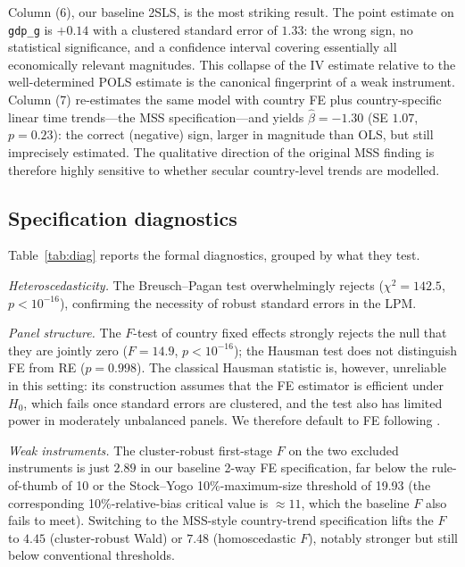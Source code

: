 \documentclass[11pt,a4paper]{article}
\begin{document}
Column (6), our baseline 2SLS, is the most striking result. The
point estimate on \texttt{gdp\_g} is $+0.14$ with a clustered
standard error of $1.33$: the wrong sign, no statistical
significance, and a confidence interval covering essentially all
economically relevant magnitudes. This collapse of the IV estimate
relative to the well-determined POLS estimate is the canonical
fingerprint of a weak instrument. Column (7) re-estimates the same
model with country FE plus country-specific linear time trends---the
MSS specification---and yields $\hat\beta=-1.30$ (SE $1.07$,
$p=0.23$): the correct (negative) sign, larger in magnitude than
OLS, but still imprecisely estimated. The qualitative direction of
the original MSS finding is therefore highly sensitive to whether
secular country-level trends are modelled.

\begin{table}[H]
\centering
\small

\caption{Effect of GDP growth on civil conflict in Africa, 1981--1999. Models~(1)--(6) include year fixed effects (where applicable); model~(7) replaces year FE with country-specific linear time trends. Cluster-robust SE in parentheses.}
\label{tab:main}
\end{table}

\subsection{Specification diagnostics}
Table~\ref{tab:diag} reports the formal diagnostics, grouped by what
they test.

\emph{Heteroscedasticity.}
The Breusch--Pagan test overwhelmingly rejects ($\chi^2=142.5$,
$p<10^{-16}$), confirming the necessity of robust standard errors in
the LPM.

\emph{Panel structure.}
The $F$-test of country fixed effects strongly rejects the null
that they are jointly zero ($F=14.9$, $p<10^{-16}$); the Hausman
test does not distinguish FE from RE ($p=0.998$). The classical
Hausman statistic is, however, unreliable in this setting: its
construction assumes that the FE estimator is efficient under
$H_0$, which fails once standard errors are clustered, and the test
also has limited power in moderately unbalanced panels. We
therefore default to FE following \citet{Wooldridge2010}.

\emph{Weak instruments.}
The cluster-robust first-stage $F$ on the two excluded instruments
is just $2.89$ in our baseline 2-way FE specification, far below
the \citet{StaigerStock1997} rule-of-thumb of 10 or the
Stock--Yogo \citep{StockYogo2005} 10\%-maximum-size threshold of
19.93 (the corresponding 10\%-relative-bias critical value is
$\approx 11$, which the baseline $F$ also fails to meet). Switching to the MSS-style country-trend specification
lifts the $F$ to $4.45$ (cluster-robust Wald) or $7.48$
(homoscedastic $F$), notably stronger but still below conventional
thresholds.
\end{document}
